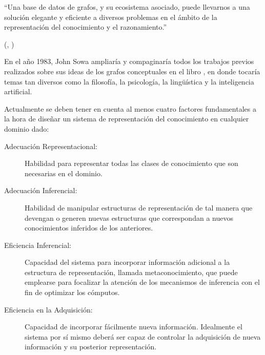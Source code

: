 	\begin{center}
		\begin{minipage}{0.9\linewidth}
			\vspace{5pt}%
			{\small
				``Una base de datos de grafos, y su ecosistema asociado, puede llevarnos a una solución elegante y eficiente a diversos problemas en el ámbito de la representación del conocimiento y el razonamiento.''
			}
			\begin{flushright}
				(\citeauthor{markorodriguez2011}, \citeyear{markorodriguez2011})
			\end{flushright}
			\vspace{5pt}%
		\end{minipage}
	\end{center}
	
	En el año 1983, John Sowa ampliaría y compaginaría todos los trabajos previos realizados sobre sus ideas de los grafos conceptuales en el libro , en donde tocaría temas tan diversos como la filosofía, la psicología, la lingüística y la inteligencia artificial.
	
	Actualmente se deben tener en cuenta al menos cuatro factores fundamentales a la hora de diseñar un sistema de representación del conocimiento en cualquier dominio dado:
	
	\begin{description}
		\item [Adecuación Representacional:] Habilidad para representar todas las clases de conocimiento que son necesarias en el dominio.\cite{van2008handbook}
		\item [Adecuación Inferencial:] Habilidad de manipular estructuras de representación de tal manera que devengan o generen nuevas estructuras que correspondan a nuevos conocimientos inferidos de los anteriores.\cite{van2008handbook}
		\item [Eficiencia Inferencial:] Capacidad del sistema para incorporar información adicional a la estructura de representación, llamada metaconocimiento, que puede emplearse para focalizar la atención de los mecanismos de inferencia con el fin de optimizar los cómputos.\cite{van2008handbook}
		\item [Eficiencia en la Adquisición:] Capacidad de incorporar fácilmente nueva información. Idealmente el sistema por sí mismo deberá ser capaz de controlar la adquisición de nueva información y su posterior representación.\cite{van2008handbook}
	\end{description}
